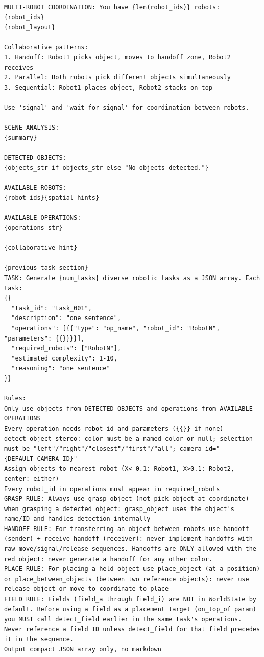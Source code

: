 \documentclass[
     12pt,
     a4paper,
     BCOR=10mm,
     DIV=14,
     listof=totoc,
     bibliography=totoc,
     parskip,
     twoside,
     headsepline
     ]{scrreprt}
\begin{document}
\begin{lstlisting}[caption={AutoRT task generation prompt integrating VLM scene analysis, operational schemas, and multi-robot collaborative patterns.}, extendedchars=true]
MULTI-ROBOT COORDINATION: You have {len(robot_ids)} robots: {robot_ids}
{robot_layout}

Collaborative patterns:
1. Handoff: Robot1 picks object, moves to handoff zone, Robot2 receives
2. Parallel: Both robots pick different objects simultaneously
3. Sequential: Robot1 places object, Robot2 stacks on top

Use 'signal' and 'wait_for_signal' for coordination between robots.

SCENE ANALYSIS:
{summary}

DETECTED OBJECTS:
{objects_str if objects_str else "No objects detected."}

AVAILABLE ROBOTS:
{robot_ids}{spatial_hints}

AVAILABLE OPERATIONS:
{operations_str}

{collaborative_hint}

{previous_task_section}
TASK: Generate {num_tasks} diverse robotic tasks as a JSON array. Each task:
{{
  "task_id": "task_001",
  "description": "one sentence",
  "operations": [{{"type": "op_name", "robot_id": "RobotN", "parameters": {{}}}}],
  "required_robots": ["RobotN"],
  "estimated_complexity": 1-10,
  "reasoning": "one sentence"
}}

Rules:
Only use objects from DETECTED OBJECTS and operations from AVAILABLE OPERATIONS
Every operation needs robot_id and parameters ({{}} if none)
detect_object_stereo: color must be a named color or null; selection must be "left"/"right"/"closest"/"first"/"all"; camera_id="{DEFAULT_CAMERA_ID}"
Assign objects to nearest robot (X<-0.1: Robot1, X>0.1: Robot2, center: either)
Every robot_id in operations must appear in required_robots
GRASP RULE: Always use grasp_object (not pick_object_at_coordinate) when grasping a detected object: grasp_object uses the object's name/ID and handles detection internally
HANDOFF RULE: For transferring an object between robots use handoff (sender) + receive_handoff (receiver): never implement handoffs with raw move/signal/release sequences. Handoffs are ONLY allowed with the red object: never generate a handoff for any other color.
PLACE RULE: For placing a held object use place_object (at a position) or place_between_objects (between two reference objects): never use release_object or move_to_coordinate to place
FIELD RULE: Fields (field_a through field_i) are NOT in WorldState by default. Before using a field as a placement target (on_top_of param) you MUST call detect_field earlier in the same task's operations. Never reference a field ID unless detect_field for that field precedes it in the sequence.
Output compact JSON array only, no markdown
\end{lstlisting}
\end{document}
